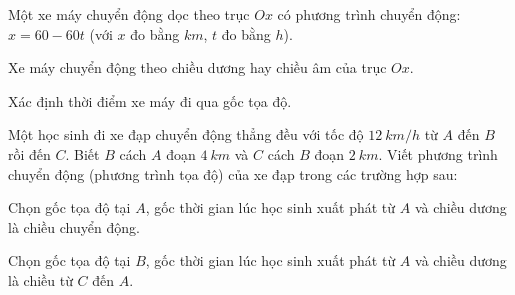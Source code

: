 \begin{vidu}%
Một xe máy chuyển động dọc theo trục $Ox$ có phương trình chuyển động: $x = 60 - 60t$ (với $x$ đo bằng $km$, $t$ đo bằng $h$).
\begin{vdc}
Xe máy chuyển động theo chiều dương hay chiều âm của trục $Ox$.
\end{vdc}
\begin{vdc}		
Xác định thời điểm xe máy đi qua gốc tọa độ.
\end{vdc}
\end{vidu}
\begin{vidu}%
Một học sinh đi xe đạp chuyển động thẳng đều với tốc độ $12\ km/h$ từ $A$ đến $B$ rồi đến $C$. Biết $B$ cách $A$ đoạn $4\ km$ và $C$ cách $B$ đoạn $2\ km$. Viết phương trình chuyển động (phương trình tọa độ) của xe đạp trong các trường hợp sau:
\begin{vdc}
Chọn gốc tọa độ tại $A$, gốc thời gian lúc học sinh xuất phát từ $A$ và chiều dương là chiều chuyển động.
\end{vdc} 
\begin{vdc} 
Chọn gốc tọa độ tại $B$, gốc thời gian lúc học sinh xuất phát từ $A$ và chiều dương là chiều từ $C$ đến $A$.
\end{vdc}
\end{vidu}


